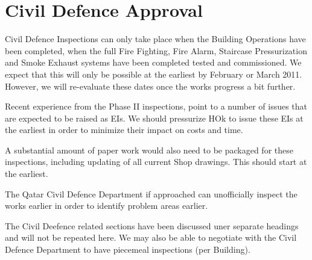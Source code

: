 \chapter{Civil Defence Approval}

Civil Defence Inspections can only take place when the Building Operations have been completed, when the full Fire Fighting,  Fire Alarm, Staircase Pressurization and Smoke Exhaust systems have been completed tested and commissioned. We expect that this will only be possible at the earliest by February or March  2011. However, we will re-evaluate these dates once the works progress a bit further. 

Recent experience from the Phase II inspections, point to a number of issues that are expected to be raised as EIs. We should pressurize HOk to issue these EIs at the earliest in order to minimize their impact on costs and time.

A substantial amount of paper work would also need to be packaged for these inspections, including updating of all current Shop drawings. This should start at the earliest. 

The Qatar Civil Defence Department if approached can unofficially inspect the works earlier in order to identify problem areas earlier.

The Civil Deefence related sections have been discussed uner separate headings and will not be repeated here. We may also be able to negotiate with the Civil Defence Department to have  piecemeal inspections (per Building).




